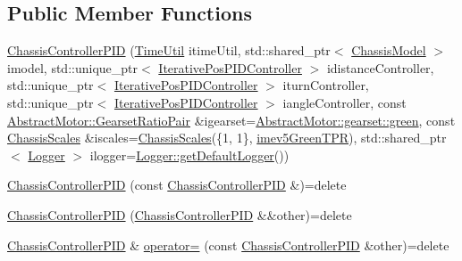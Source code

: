 \subsection*{Public Member Functions}
\begin{DoxyCompactItemize}
\item 
\mbox{\hyperlink{classokapi_1_1ChassisControllerPID_ab11bd00c672aa7e9d93e313e00deb1b6}{Chassis\+Controller\+P\+ID}} (\mbox{\hyperlink{classokapi_1_1TimeUtil}{Time\+Util}} itime\+Util, std\+::shared\+\_\+ptr$<$ \mbox{\hyperlink{classokapi_1_1ChassisModel}{Chassis\+Model}} $>$ imodel, std\+::unique\+\_\+ptr$<$ \mbox{\hyperlink{classokapi_1_1IterativePosPIDController}{Iterative\+Pos\+P\+I\+D\+Controller}} $>$ idistance\+Controller, std\+::unique\+\_\+ptr$<$ \mbox{\hyperlink{classokapi_1_1IterativePosPIDController}{Iterative\+Pos\+P\+I\+D\+Controller}} $>$ iturn\+Controller, std\+::unique\+\_\+ptr$<$ \mbox{\hyperlink{classokapi_1_1IterativePosPIDController}{Iterative\+Pos\+P\+I\+D\+Controller}} $>$ iangle\+Controller, const \mbox{\hyperlink{structokapi_1_1AbstractMotor_1_1GearsetRatioPair}{Abstract\+Motor\+::\+Gearset\+Ratio\+Pair}} \&igearset=\mbox{\hyperlink{classokapi_1_1AbstractMotor_a88aaa6ea2fa10f5520a537bbf26774d5a9f27410725ab8cc8854a2769c7a516b8}{Abstract\+Motor\+::gearset\+::green}}, const \mbox{\hyperlink{classokapi_1_1ChassisScales}{Chassis\+Scales}} \&iscales=\mbox{\hyperlink{classokapi_1_1ChassisScales}{Chassis\+Scales}}(\{1, 1\}, \mbox{\hyperlink{namespaceokapi_a5263bab3bfecd482a573b6d04fb584ac}{imev5\+Green\+T\+PR}}), std\+::shared\+\_\+ptr$<$ \mbox{\hyperlink{classokapi_1_1Logger}{Logger}} $>$ ilogger=\mbox{\hyperlink{classokapi_1_1Logger_a5053cf778b4b55acba788a3797dc96d2}{Logger\+::get\+Default\+Logger}}())
\item 
\mbox{\hyperlink{classokapi_1_1ChassisControllerPID_a25b31c86a76d08d4f58c6efdb8c7ee57}{Chassis\+Controller\+P\+ID}} (const \mbox{\hyperlink{classokapi_1_1ChassisControllerPID}{Chassis\+Controller\+P\+ID}} \&)=delete
\item 
\mbox{\hyperlink{classokapi_1_1ChassisControllerPID_ae486bf897f588847f5f8d8ba4248da88}{Chassis\+Controller\+P\+ID}} (\mbox{\hyperlink{classokapi_1_1ChassisControllerPID}{Chassis\+Controller\+P\+ID}} \&\&other)=delete
\item 
\mbox{\hyperlink{classokapi_1_1ChassisControllerPID}{Chassis\+Controller\+P\+ID}} \& \mbox{\hyperlink{classokapi_1_1ChassisControllerPID_ad3c879b42ad7f5a0d05b2799a9e5c3dd}{operator=}} (const \mbox{\hyperlink{classokapi_1_1ChassisControllerPID}{Chassis\+Controller\+P\+ID}} \&other)=delete

\end{DoxyCompactItemize}
